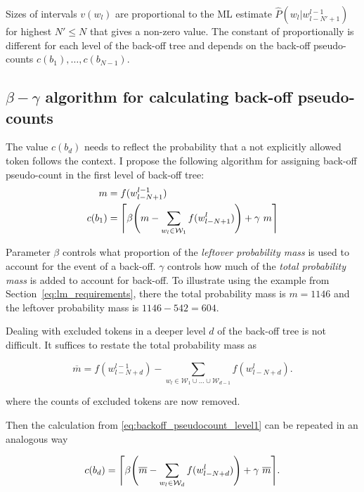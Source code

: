 \documentclass[draft]{IIBproject}
\DeclarePairedDelimiter{\ceil}{\lceil}{\rceil}
\DeclarePairedDelimiter{\bracket}{(}{)}
\begin{document}
Sizes of intervals $v(w_l)$ are proportional to the ML estimate $\hat P(w_l | w_{l-N'+1}^{l-1})$ for highest $N' \le N$ that gives a non-zero value. The constant of proportionally is different for each level of the back-off tree and depends on the back-off pseudo-counts $c(b_1), \dots, c(b_{N-1})$.

\subsection{$\beta-\gamma$ algorithm for calculating back-off pseudo-counts}
\label{sec:beta_gamma_backoff}

The value $c(b_d)$ needs to reflect the probability that a not explicitly allowed token follows the context. I propose the following algorithm for assigning back-off pseudo-count in the first level of back-off tree:
%
\begin{align}
\label{eq:total_probability_mass} m &= f(w_{l-N+1}^{l-1}) \\
\label{eq:backoff_pseudocount_level1} c(b_1) &= \ceil*{ \beta \bracket*{ m - \sum_{w_l \in \mathcal W_1} f(w_{l-N+1}^l) } + \gamma ~ m }
\end{align}

Parameter $\beta$ controls what proportion of the \emph{leftover probability mass} is used to account for the event of a back-off. $\gamma$ controls how much of the \emph{total probability mass} is added to account for back-off. To illustrate using the example from Section~\ref{eq:lm_requirements}, there the total probability mass is $m = 1146$ and the leftover probability mass is $1146-542=604$.

Dealing with excluded tokens in a deeper level $d$ of the back-off tree is not difficult. It suffices to restate the total probability mass as

\begin{equation}
\label{eq:adjusted_total_probability_mass}
\overline m = f(w_{l-N+d}^{l-1}) - \sum_{w_l \in \mathcal W_1 \cup \dots \cup \mathcal W_{d-1}} f(w_{l-N+d}^l).
\end{equation}

where the counts of excluded tokens are now removed.

Then the calculation from \cref{eq:backoff_pseudocount_level1} can be repeated in an analogous way

\begin{equation}
\label{eq:backoff_pseudocount_deep_levels}
c(b_d) = \ceil*{ \beta \bracket*{ \overline m - \sum_{w_l \in \mathcal W_d} f(w_{l-N+d}^l) } + \gamma ~ \overline m }.
\end{equation}
\end{document}
